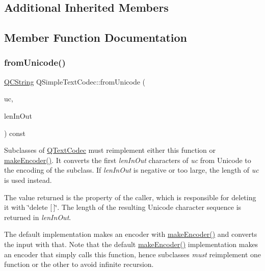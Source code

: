 \subsection*{Additional Inherited Members}


\subsection{Member Function Documentation}
\mbox{\label{class_q_simple_text_codec_ac361f6788c0ef27376ed31744c0beaf4}} 
\subsubsection{\texorpdfstring{fromUnicode()}{fromUnicode()}}
{\footnotesize\ttfamily \mbox{\hyperlink{class_q_c_string}{Q\+C\+String}} Q\+Simple\+Text\+Codec\+::from\+Unicode (\begin{DoxyParamCaption}\item[{const \mbox{\hyperlink{class_q_string}{Q\+String}} \&}]{uc,  }\item[{int \&}]{len\+In\+Out }\end{DoxyParamCaption}) const\hspace{0.3cm}{\ttfamily [virtual]}}

Subclasses of \mbox{\hyperlink{class_q_text_codec}{Q\+Text\+Codec}} must reimplement either this function or \mbox{\hyperlink{class_q_text_codec_aa7dccd7fc1b578de0b7599b040d98e11}{make\+Encoder()}}. It converts the first {\itshape len\+In\+Out} characters of {\itshape uc} from Unicode to the encoding of the subclass. If {\itshape len\+In\+Out} is negative or too large, the length of {\itshape uc} is used instead.

The value returned is the property of the caller, which is responsible for deleting it with \char`\"{}delete \mbox{[}$\,$\mbox{]}\char`\"{}. The length of the resulting Unicode character sequence is returned in {\itshape len\+In\+Out}.

The default implementation makes an encoder with \mbox{\hyperlink{class_q_text_codec_aa7dccd7fc1b578de0b7599b040d98e11}{make\+Encoder()}} and converts the input with that. Note that the default \mbox{\hyperlink{class_q_text_codec_aa7dccd7fc1b578de0b7599b040d98e11}{make\+Encoder()}} implementation makes an encoder that simply calls this function, hence subclasses {\itshape must} reimplement one function or the other to avoid infinite recursion. 

